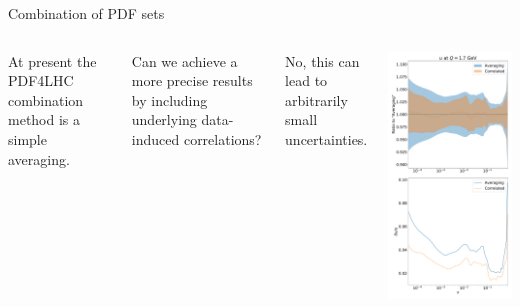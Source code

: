 \begin{frame}{Combination of PDF sets}
    	\begin{columns}[t]

			At present the PDF4LHC combination method is a simple averaging. 

        	\vspace{0.2cm}

			Can we achieve a more precise results by including underlying data-induced correlations?

        	\vspace{0.2cm}

			No, this can lead to arbitrarily small uncertainties.

       	\vspace{-1.5cm}
       	\begin{center}
       		\includegraphics[height=1\textheight]{roy_pdf_correlations/ratio_2.pdf}

\end{center}
\end{columns}
\end{frame}
